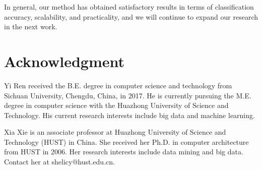\documentclass{ieeeaccess}
\begin{document}
In general, our method has obtained satisfactory results in terms of classification accuracy, scalability, and practicality, and we will continue to expand our research in the next work.


\section*{Acknowledgment}





\begin{IEEEbiography}{Yi Ren}
	received the B.E. degree in computer science and technology from Sichuan University, Chengdu, China, in 2017. He is currently pursuing the M.E. degree in computer science with the Huazhong University of Science and Technology. His current research interests include big data and machine learning.
	
	
\end{IEEEbiography}

\begin{IEEEbiography}{Xia Xie} is an associate professor at Huazhong University of Science and Technology (HUST) in China. She received her Ph.D. in computer architecture from HUST in 2006. Her research interests include data mining and big data. Contact her at shelicy@hust.edu.cn.
\end{IEEEbiography}
\end{document}
